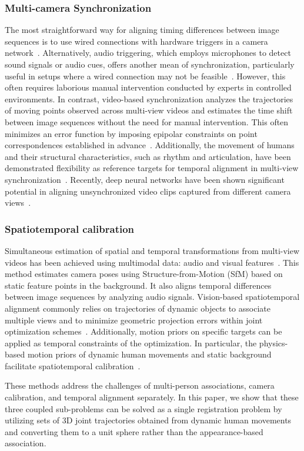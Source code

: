 \subsubsection{Multi-camera Synchronization}

The most straightforward way for aligning timing differences between image sequences is to use wired connections with hardware triggers in a camera network~\cite{Sigal2010HumanEvaSV}. Alternatively, audio triggering, which employs microphones to detect sound signals or audio cues, offers another mean of synchronization, particularly useful in setups where a wired connection may not be feasible~\cite{Joo_2017_TPAMI,hasler2009markerless}. However, this often requires laborious manual intervention conducted by experts in controlled environments. In contrast, video-based synchronization analyzes the trajectories of moving points observed across multi-view videos and estimates the time shift between image sequences without the need for manual intervention. This often minimizes an error function by imposing epipolar constraints on point correspondences established in advance~\cite{albl2017two}. Additionally, the movement of humans and their structural characteristics, such as rhythm and articulation, have been demonstrated flexibility as reference targets for temporal alignment in multi-view synchronization~\cite{Takahashi18,elhayek2012feature}. Recently, deep neural networks have been shown significant potential in aligning unsynchronized video clips captured from different camera views~\cite{Liu_Ai_Xing_Li_Wang_Tao_2024,wu2019multi,jenni2020self}. 


\subsubsection{Spatiotemporal calibration}

 

Simultaneous estimation of spatial and temporal transformations from multi-view videos has been achieved using multimodal data: audio and visual features~\cite{hasler2009markerless}. This method estimates camera poses using Structure-from-Motion (SfM) based on static feature points in the background. It also aligns temporal differences between image sequences by analyzing audio signals. Vision-based spatiotemporal alignment commonly relies on trajectories of dynamic objects to associate multiple views and to minimize geometric projection errors within joint optimization schemes~\cite{caspi2006feature,albl2017two,Takahashi18}. Additionally, motion priors on specific targets can be applied as temporal constraints of the optimization.  In particular, the physics-based motion priors of dynamic human movements and static background facilitate spatiotemporal calibration~\cite{Vo2020SpatiotemporalBA}.

These methods address the challenges of multi-person associations, camera calibration, and temporal alignment separately. In this paper, we show that these three coupled sub-problems can be solved as a single registration problem by utilizing sets of 3D joint trajectories obtained from dynamic human movements and converting them to a unit sphere rather than the appearance-based association.